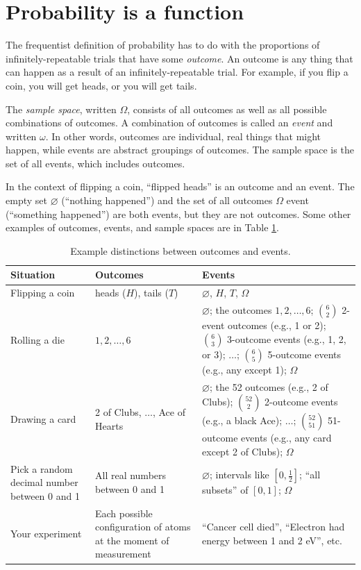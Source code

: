 \section{Probability is a function}

The frequentist definition of probability has to do with the
proportions of infinitely-repeatable trials that have some \emph{outcome}. An
outcome is any thing that can happen as a result of an infinitely-repeatable
trial. For example, if you flip a coin, you will get heads, or you will get
tails.

The \emph{sample space}, written $\Omega$, consists of all outcomes as well as
all possible combinations of outcomes. A combination of outcomes is called an
\emph{event} and written $\omega$. In other words, outcomes are individual,
real things that might happen, while events are abstract groupings of
outcomes. The sample space is the set of all events, which includes outcomes.

In the context of flipping a coin, ``flipped
heads'' is an outcome and an event. The empty set $\varnothing$ (``nothing
happened'') and the set of all outcomes $\Omega$ event (``something happened'')
are both events, but they are not outcomes. Some other examples of outcomes,
events, and sample spaces are in Table \ref{tab:outcome-event}. 

\begin{table}
\centering
\begin{tabular}{p{3cm}p{4cm}p{6cm}}
\toprule
Situation & Outcomes & Events \\
\midrule
Flipping a coin & heads ($H$), tails ($T$) & $\varnothing$, $H$, $T$, $\Omega$ \\
Rolling a die & $1, 2, \ldots, 6$ & $\varnothing$; the outcomes $1, 2, \ldots, 6$; $\binom{6}{2}$ 2-event outcomes (e.g., 1 or 2); $\binom{6}{3}$ 3-outcome events (e.g., 1, 2, or 3); $\ldots$; $\binom{6}{5}$ 5-outcome events (e.g., any except 1); $\Omega$ \\
Drawing a card & 2 of Clubs, $\ldots$, Ace of Hearts & $\varnothing$; the 52 outcomes (e.g., 2 of Clubs); $\binom{52}{2}$ 2-outcome events (e.g., a black Ace); $\ldots$; $\binom{52}{51}$ 51-outcome events (e.g., any card except 2 of Clubs); $\Omega$ \\
Pick a random decimal number between 0 and 1 & All real numbers between 0 and 1 & $\varnothing$; intervals like $[0, \tfrac{1}{2}]$; ``all subsets'' of $[0, 1]$; $\Omega$ \\
Your experiment & Each possible configuration of atoms at the moment of measurement & ``Cancer cell died'', ``Electron had energy between 1 and 2 eV'', etc. \\
\bottomrule
\end{tabular}
\caption{Example distinctions between outcomes and events.}
\label{tab:outcome-event}
\end{table}

